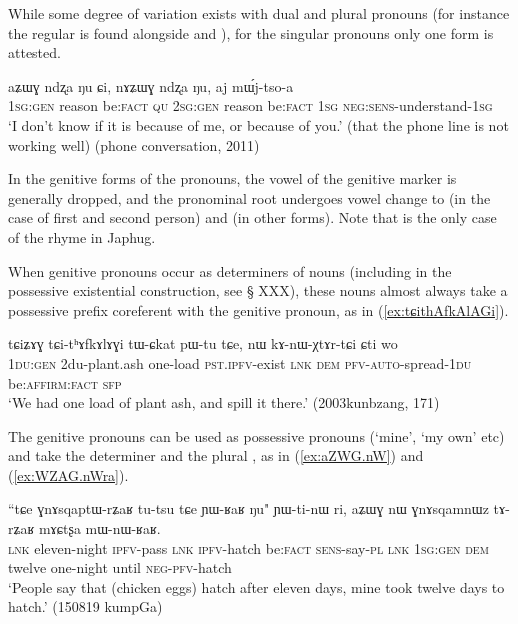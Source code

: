While some degree of variation exists with dual and plural pronouns (for instance the regular  is found alongside  and ), for the singular pronouns only one form is attested.

\begin{exe}
\ex
\gll aʑɯɣ 	ndʐa 	ŋu 	ɕi, 	nɤʑɯɣ 	ndʐa 	ŋu, 	aj 	mɯ́j-tso-a   \\
\textsc{1sg:gen} reason be:\textsc{fact} \textsc{qu} \textsc{2sg:gen} reason be:\textsc{fact} \textsc{1sg} \textsc{neg:sens}-understand-\textsc{1sg} \\
\glt  `I don't know if it is because of me, or because of you.' (that the phone line is not working well) (phone conversation, 2011) %
\end{exe} 

In the genitive forms of the pronouns, the vowel of the genitive marker is generally dropped, and the pronominal root  undergoes vowel change to  (in the case of first and second person) and  (in other forms). Note that  is the only case of the rhyme  in Japhug.

When genitive pronouns occur as determiners of nouns (including in the possessive existential construction, see § XXX), these nouns almost always take a possessive prefix coreferent with the genitive pronoun, as in (\ref{ex:tɕithAfkAlAGi}).

\begin{exe}
\ex \label{ex:tɕithAfkAlAGi}
\gll 
tɕiʑɤɣ tɕi-tʰɤfkɤlɤɣi tɯ-ɕkat pɯ-tu tɕe, nɯ kɤ-nɯ-χtɤr-tɕi ɕti wo \\
\textsc{1du:gen} 2du-plant.ash one-load \textsc{pst.ipfv}-exist \textsc{lnk} \textsc{dem} \textsc{pfv-auto}-spread-\textsc{1du} be:\textsc{affirm}:\textsc{fact} \textsc{sfp} \\
\glt `We had one load of plant ash, and spill it there.' (2003kunbzang, 171)
\end{exe} 

The genitive pronouns can be used as possessive pronouns (`mine', `my own' etc) and take the determiner  and the plural , as in (\ref{ex:aZWG.nW}) and (\ref{ex:WZAG.nWra}).

\begin{exe}
\ex \label{ex:aZWG.nW}
\gll ``tɕe ɣnɤsqaptɯ-rʑaʁ tu-tsu tɕe ɲɯ-ʁaʁ ŋu" ɲɯ-ti-nɯ ri, aʑɯɣ nɯ ɣnɤsqamnɯz tɤ-rʑaʁ mɤɕtʂa mɯ-nɯ-ʁaʁ. \\
\textsc{lnk} eleven-night \textsc{ipfv}-pass \textsc{lnk} \textsc{ipfv}-hatch be:\textsc{fact} \textsc{sens}-say-\textsc{pl} \textsc{lnk} \textsc{1sg:gen} \textsc{dem} twelve one-night  until \textsc{neg-pfv}-hatch \\
\glt `People say that (chicken eggs) hatch after eleven days, mine took twelve days to hatch.' (150819 kumpGa)
\end{exe} 

